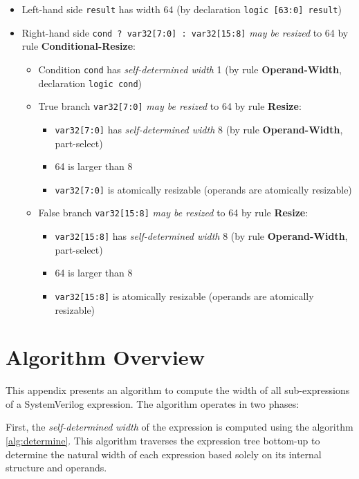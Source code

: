 \documentclass{article}
\newcommand{\sv}[1]{\texttt{#1}}
\newcommand{\sds}{\emph{self-determined width}}
\newcommand{\mbr}{\emph{may be resized}}
\begin{document}
\begin{itemize}
  \item Left-hand side \sv{result} has width 64 (by declaration
    \sv{logic [63:0] result})
  \item Right-hand side \sv{cond ? var32[7:0] : var32[15:8]}
    \mbr{} to 64 by rule \textbf{Conditional-Resize}:
    \begin{itemize}
      \item Condition \sv{cond} has \sds{} 1 (by rule
        \textbf{Operand-Width}, declaration \sv{logic cond})
      \item True branch \sv{var32[7:0]} \mbr{} to 64 by rule
        \textbf{Resize}:
        \begin{itemize}
          \item \sv{var32[7:0]} has \sds{} 8 (by rule
            \textbf{Operand-Width}, part-select)
          \item 64 is larger than 8
          \item \sv{var32[7:0]} is atomically resizable (operands are
            atomically resizable)
        \end{itemize}
      \item False branch \sv{var32[15:8]} \mbr{} to 64 by
        rule \textbf{Resize}:
        \begin{itemize}
          \item \sv{var32[15:8]} has \sds{} 8 (by rule
            \textbf{Operand-Width}, part-select)
          \item 64 is larger than 8
          \item \sv{var32[15:8]} is atomically resizable (operands are
            atomically resizable)
        \end{itemize}
    \end{itemize}
\end{itemize}

\appendix
\section{Algorithm Overview}

This appendix presents an algorithm to compute the width of all sub-expressions
of a SystemVerilog expression. The algorithm operates in two phases:

First, the \sds{} of the expression is computed using the algorithm
\ref{alg:determine}. This algorithm traverses the expression
tree bottom-up to determine the natural width of each expression based solely on
its internal structure and operands.
\end{document}
